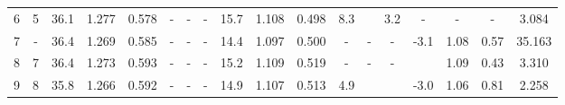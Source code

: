 \begin{landscape}
\begin{table}[b]
\begin{tabular}{cccccccccccccccccc}
		6     & 5        & 36.1 & 1.277 & 0.578 & -     & -     & -     & 15.7 & 1.108 & 0.498 & 8.3 & \color{red}{-4.3} & 3.2 & -     & -    & -    & 3.084      \\
		7     & -        & 36.4 & 1.269 & 0.585 & -     & -     & -     & 14.4 & 1.097 & 0.500 & -   & -     & -    & -3.1 & 1.08 & 0.57 & 35.163     \\
		8     & 7        & 36.4 & 1.273 & 0.593 & -     & -     & -     & 15.2 & 1.109 & 0.519 & -   & -     & -    & \color{blue}{-3.1} & 1.09 & 0.43 & 3.310      \\
		9     & 8        & 35.8 & 1.266 & 0.592 & -     & -     & -     & 14.9 & 1.107 & 0.513 & 4.9 & \color{red}{1.03}  & \color{red}{1.23} & -3.0 & 1.06 & 0.81 & 2.258      \\
		\hline
		\hline
	\end{tabular}
\end{table}
\end{landscape}
